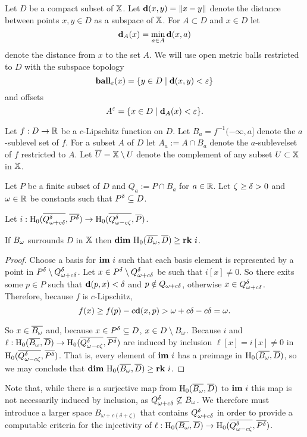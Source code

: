 
Let $D$ be a compact subset of $\mathbb{X}$.
Let $\mathbf{d}(x, y) = \|x - y\|$ denote the distance between points $x,y\in D$ as a subspace of $\mathbb{X}$.
For $A\subset D$ and $x\in D$ let
\[\mathbf{d}_A(x) = \min_{a\in A}\mathbf{d}(x, a)\]
denote the distance from $x$ to the set $A$.
We will use open metric balls restricted to $D$ with the subspace topology
\[\mathbf{ball}_\varepsilon(x) = \{y\in D\mid \mathbf{d}(x, y) < \varepsilon\}\]
and offsets
\[A^\varepsilon = \{x\in D\mid \mathbf{d}_A(x) < \varepsilon\}.\]

Let $f : D\to \mathbb{R}$ be a $c$-Lipschitz function on $D$.
Let $B_a = f^{-1}(-\infty, a]$ denote the $a$-sublevel set of $f$.
For a subset $A$ of $D$ let $A_a := A\cap B_a$ denote the $a$-sublevelset of $f$ restricted to $A$.
Let $\overline{U} = \mathbb{X}\setminus U$ denote the complement of any subset $U\subset \mathbb{X}$ in $\mathbb{X}$.

Let $P$ be a finite subset of $D$ and $Q_a := P\cap B_a$ for $a\in\mathbb{R}$.
Let $\zeta\geq{\delta} > 0 $ and $\omega\in \mathbb{R}$ be constants such that $P^{\delta}\subseteq D$.

\begin{lemma}\label{lem:psurj}
  Let $i : \mathrm{H}_0(\overline{Q_{\omega + c{\delta}}^{\delta}}, \overline{P^{\delta}})\to \mathrm{H}_0(\overline{Q_{\omega - c\zeta}^{\delta}}, \overline{P})$.

  If $B_{\omega}$ surrounds $D$ in $\mathbb{X}$ then $\mathbf{dim}~\mathrm{H}_0(\overline{B_{\omega}}, \overline{D})\geq \mathbf{rk}~i$.
\end{lemma}
\begin{proof}
  Choose a basis for $\mathbf{im}~i$ such that each basis element is represented by a point in $P^{\delta}\setminus Q_{\omega + c{\delta}}^{\delta}$.
  Let $x\in P^{\delta}\setminus Q_{\omega + c{\delta}}^{\delta}$ be such that $i[x] \neq 0$.
  So there exits some $p\in P$ such that $\mathbf{d}(p, x) < \delta$ and $p\notin Q_{\omega + c{\delta}}$, otherwise $x\in Q_{\omega + c{\delta}}^{\delta}$.
  Therefore, because $f$ is $c$-Lipschitz,
  \[ f(x)\geq f(p) - c\mathbf{d}(x, p) > \omega + c{\delta} - c{\delta} =\omega.\]

  So $x\in\overline{B_{\omega}}$ and, because $x\in P^{\delta}\subseteq D$, $x\in D\setminus B_{\omega}$.
  Because $i$ and $\ell : \mathrm{H}_0(\overline{B_{\omega}}, \overline{D})\to \mathrm{H}_0(\overline{Q_{\omega - c\zeta}^{\delta}}, \overline{P^{\delta}})$ are induced by inclusion $\ell[x] = i[x]\neq 0$ in $\mathrm{H}_0(\overline{Q_{\omega - c\zeta}^{\delta}}, \overline{P^{\delta}})$.
  That is, every element of $\mathbf{im}~i$ has a preimage in $\mathrm{H}_0(\overline{B_{\omega}}, \overline{D})$, so we may conclude that $\mathbf{dim}~\mathrm{H}_0(\overline{B_{\omega}}, \overline{D})\geq \mathbf{rk}~i$.
\end{proof}

Note that, while there is a surjective map from $\mathrm{H}_0(\overline{B_{\omega}}, \overline{D})$ to $\mathbf{im}~i$ this map is not necessarily induced by inclusion, as $Q_{\omega + c{\delta}}^{\delta}\not\subseteq B_{\omega}$.
We therefore must introduce a larger space $B_{\omega+c(\delta+\zeta)}$ that contains $Q_{\omega + c{\delta}}^{\delta}$ in order to provide a computable criteria for the injectivity of $\ell : \mathrm{H}_0(\overline{B_{\omega}}, \overline{D})\to\mathrm{H}_0(\overline{Q_{\omega - c\zeta}^{\delta}}, \overline{P^{\delta}})$.

